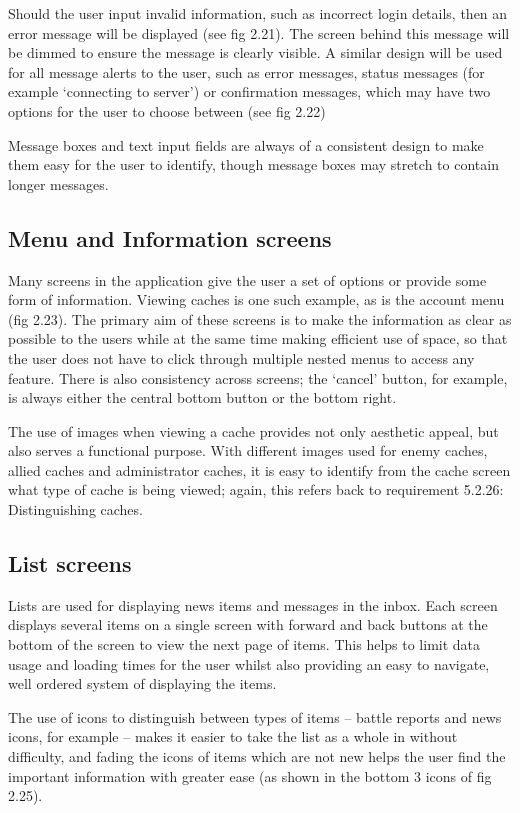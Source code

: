 Should the user input invalid information, such as incorrect login details, then an error message will be displayed (see fig 2.21). The screen behind this message will be dimmed to ensure the message is clearly visible. A similar design will be used for all message alerts to the user, such as error messages, status messages (for example ‘connecting to server’) or confirmation messages, which may have two options for the user to choose between (see fig 2.22)

Message boxes and text input fields are always of a consistent design to make them easy for the user to identify, though message boxes may stretch to contain longer messages.

\subsection{Menu and Information screens}

Many screens in the application give the user a set of options or provide some form of information. Viewing caches is one such example, as is the account menu (fig 2.23). The primary aim of these screens is to make the information as clear as possible to the users while at the same time making efficient use of space, so that the user does not have to click through multiple nested menus to access any feature. There is also consistency across screens; the ‘cancel’ button, for example, is always either the central bottom button or the bottom right.

The use of images when viewing a cache provides not only aesthetic appeal, but also serves a functional purpose. With different images used for enemy caches, allied caches and administrator caches, it is easy to identify from the cache screen what type of cache is being viewed; again, this refers back to requirement 5.2.26: Distinguishing caches.

\subsection{List screens}

Lists are used for displaying news items and messages in the inbox. Each screen displays several items on a single screen with forward and back buttons at the bottom of the screen to view the next page of items. This helps to limit data usage and loading times for the user whilst also providing an easy to navigate, well ordered system of displaying the items.

The use of icons to distinguish between types of items – battle reports and news icons, for example – makes it easier to take the list as a whole in without difficulty, and fading the icons of items which are not new helps the user find the important information with greater ease (as shown in the bottom 3 icons of fig 2.25).

